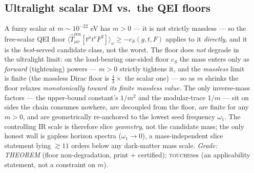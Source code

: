 \documentclass[11pt]{article}
\newcommand{\touch}{{\normalfont\scshape touches}}
\begin{document}
\subsection{Ultralight scalar DM vs.\ the QEI floors}\label{sec:floors}
A fuzzy scalar at $m\sim10^{-22}$ eV has $m>0$ --- it is not strictly massless
--- so the free-scalar QEI floor $\langle\widehat T^{\mathrm{ren}}_{\mu\nu}[t^\mu
t^\nu F^2]\rangle_\omega\ge-c_S(g,t,F)$ applies to it \emph{directly}, and it is
the \emph{best}-served candidate class, not the worst. The floor does \emph{not}
degrade in the ultralight limit: on the load-bearing one-sided floor $c_S$ the
mass enters only as \emph{forward} (tightening) powers --- $m>0$ strictly
tightens it, and the \emph{massless} limit is finite (the massless Dirac floor
is $\tfrac43\times$ the scalar one) --- so as $m$ shrinks the floor relaxes
\emph{monotonically toward its finite massless value}.
The only inverse-mass factors --- the upper-bound constant's $1/m^2$ and the
modular-trace $1/m$ --- sit on sides the chain consumes nowhere, are decoupled
from the floor, are finite for any $m>0$, and are geometrically re-anchored to
the lowest seed frequency $\omega_1$. The controlling IR scale is therefore
slice \emph{geometry}, not the candidate mass; the only honest wall is gapless
horizon spectra ($\omega_1\to0$), a mass-independent slice statement lying
$\gtrsim11$ orders below any dark-matter mass scale.
\emph{Grade: THEOREM} (floor non-degradation, print + certified); \touch{}es (an
applicability statement, not a constraint on $m$).
\end{document}
